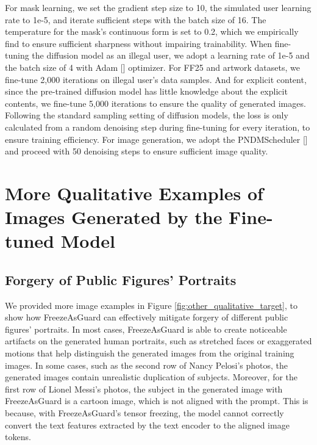 \documentclass{article}
\begin{document}
For mask learning, we set the gradient step size to 10, the simulated user learning rate to 1e-5, and iterate sufficient steps with the batch size of 16. The temperature for the mask's continuous form is set to 0.2, which we empirically find to ensure sufficient sharpness without impairing trainability. When fine-tuning the diffusion model as an illegal user, we adopt a learning rate of 1e-5 and the batch size of 4 with Adam [] optimizer. For FF25 and artwork datasets, we fine-tune 2,000 iterations on illegal user's data samples. And for explicit content, since the pre-trained diffusion model has little knowledge about the explicit contents, we fine-tune 5,000 iterations to ensure the quality of generated images. Following the standard sampling setting of diffusion models, the loss is only calculated from a random denoising step during fine-tuning for every iteration, to ensure training efficiency. For image generation, we adopt the PNDMScheduler [] and proceed with 50 denoising steps to ensure sufficient image quality.

\section{More Qualitative Examples of Images Generated by the Fine-tuned Model}\label{sec:more_qualitative_examples}

\subsection{Forgery of Public Figures' Portraits}\label{sec:more_examples_figures}

We provided more image examples in Figure \ref{fig:other_qualitative_target}, to show how FreezeAsGuard can effectively mitigate forgery of different public figures' portraits. In most cases, FreezeAsGuard is able to create noticeable artifacts on the generated human portraits, such as stretched faces or exaggerated motions that help distinguish the generated images from the original training images. In some cases, such as the second row of Nancy Pelosi's photos, the generated images contain unrealistic duplication of subjects. Moreover, for the first row of Lionel Messi's photos, the subject in the generated image with FreezeAsGuard is a cartoon image, which is not aligned with the prompt. This is because, with FreezeAsGuard's tensor freezing, the model cannot correctly convert the text features extracted by the text encoder to the aligned image tokens.
\end{document}
